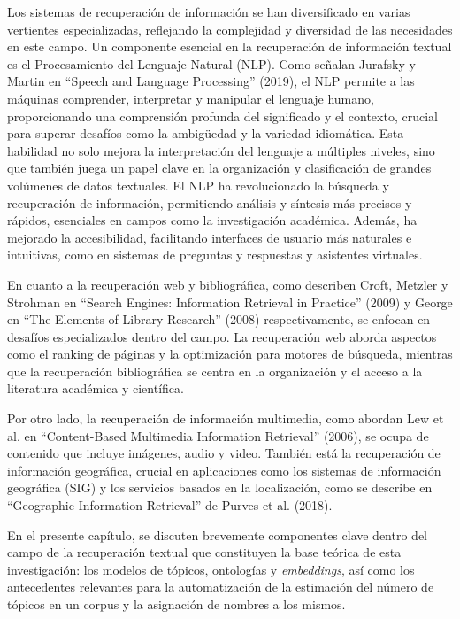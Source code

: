 Los sistemas de recuperación de información se han diversificado en varias vertientes especializadas, reflejando la complejidad y diversidad de las necesidades en este campo. Un componente esencial en la recuperación de información textual es el Procesamiento del Lenguaje Natural (NLP). Como señalan Jurafsky y Martin en ``Speech and Language Processing'' (2019), el NLP permite a las máquinas comprender, interpretar y manipular el lenguaje humano, proporcionando una comprensión profunda del significado y el contexto, crucial para superar desafíos como la ambigüedad y la variedad idiomática. Esta habilidad no solo mejora la interpretación del lenguaje a múltiples niveles, sino que también juega un papel clave en la organización y clasificación de grandes volúmenes de datos textuales. El NLP ha revolucionado la búsqueda y recuperación de información, permitiendo análisis y síntesis más precisos y rápidos, esenciales en campos como la investigación académica. Además, ha mejorado la accesibilidad, facilitando interfaces de usuario más naturales e intuitivas, como en sistemas de preguntas y respuestas y asistentes virtuales.

En cuanto a la recuperación web y bibliográfica, como describen Croft, Metzler y Strohman en ``Search Engines: Information Retrieval in Practice'' (2009) y George en ``The Elements of Library Research'' (2008) respectivamente, se enfocan en desafíos especializados dentro del campo. La recuperación web aborda aspectos como el ranking de páginas y la optimización para motores de búsqueda, mientras que la recuperación bibliográfica se centra en la organización y el acceso a la literatura académica y científica. 

Por otro lado, la recuperación de información multimedia, como abordan Lew et al. en ``Content-Based Multimedia Information Retrieval'' (2006), se ocupa de contenido que incluye imágenes, audio y video. También está la recuperación de información geográfica, crucial en aplicaciones como los sistemas de información geográfica (SIG) y los servicios basados en la localización, como se describe en ``Geographic Information Retrieval'' de Purves et al. (2018).

En el presente capítulo, se discuten brevemente componentes clave dentro del campo de la recuperación textual que constituyen la base te\'orica de esta investigaci\'on: los modelos de tópicos, ontologías y \textit{embeddings}, así como los antecedentes relevantes para la automatización de la estimación del número de tópicos en un corpus y la asignación de nombres a los mismos.

